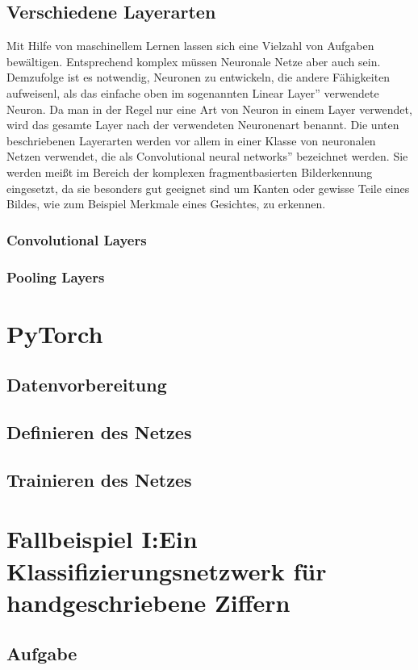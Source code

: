 \documentclass{article}
\begin{document}
\subsection{Verschiedene Layerarten}
Mit Hilfe von maschinellem Lernen lassen sich eine Vielzahl von Aufgaben bewältigen. Entsprechend komplex müssen Neuronale Netze aber auch sein. Demzufolge ist es notwendig, Neuronen zu entwickeln, die andere Fähigkeiten aufweisenl, als das einfache oben im sogenannten \glqq Linear Layer'' verwendete Neuron. Da man in der Regel nur eine Art von Neuron in einem Layer verwendet, wird das gesamte Layer nach der verwendeten Neuronenart benannt. Die unten beschriebenen Layerarten werden vor allem in einer Klasse von neuronalen Netzen verwendet, die als \glqq Convolutional neural networks'' bezeichnet werden. Sie werden meißt im Bereich der komplexen fragmentbasierten Bilderkennung eingesetzt, da sie besonders gut geeignet sind um Kanten oder gewisse Teile eines Bildes, wie zum Beispiel Merkmale eines Gesichtes, zu erkennen.
\subsubsection{Convolutional Layers}
\subsubsection{Pooling Layers}
\section{PyTorch}
\subsection{Datenvorbereitung}
\subsection{Definieren des Netzes}
\subsection{Trainieren des Netzes}
\section{Fallbeispiel I:\newline Ein Klassifizierungsnetzwerk für handgeschriebene Ziffern}
\subsection{Aufgabe}
\end{document}
